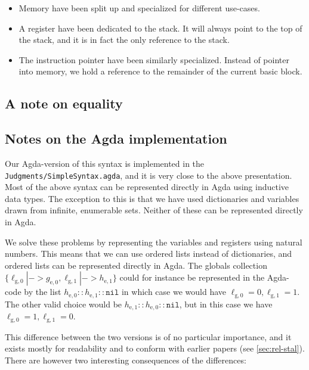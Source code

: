 \begin{itemize}
\item Memory have been split up and specialized for different use-cases.
\item A register have been dedicated to the stack. It will always point to the
  top of the stack, and it is in fact the only reference to the stack.
\item The instruction pointer have been similarly specialized. Instead of
  pointer into memory, we hold a reference to the remainder of the current basic
  block.
\end{itemize}

\subsection{A note on equality}

\subsection{Notes on the Agda implementation}

Our Agda-version of this syntax is implemented in the
\texttt{Judgments/SimpleSyntax.agda}, and it is very close to the above
presentation. Most of the above syntax can be represented directly in Agda using
inductive data types. The exception to this is that we have used dictionaries
and variables drawn from infinite, enumerable sets. Neither of these can be
represented directly in Agda.

We solve these problems by representing the variables and registers using
natural numbers. This means that we can use ordered lists instead of
dictionaries, and ordered lists can be represented directly in Agda. The globals
collection
$\{\ell_{\mathrm{g},0} |-> g_{\mathrm{e},0}, \ell_{\mathrm{g},1} |->
h_{\mathrm{e},1}\}$ could for instance be represented in the Agda-code by the
list $h_{\mathrm{e},0} :: h_{\mathrm{e},1} :: \mathtt{nil}$ in which case we
would have $\ell_{\mathrm{g},0} = 0, \ell_{\mathrm{g},1} = 1$. The other valid
choice would be $h_{\mathrm{e},1} :: h_{\mathrm{e},0} :: \mathtt{nil}$, but in
this case we have $\ell_{\mathrm{g},0} = 1, \ell_{\mathrm{g},1} = 0$.

This difference between the two versions is of no particular importance, and it
exists mostly for readability and to conform with earlier papers (see
\cref{sec:rel-stal}). There are however two interesting consequences of the
differences:

